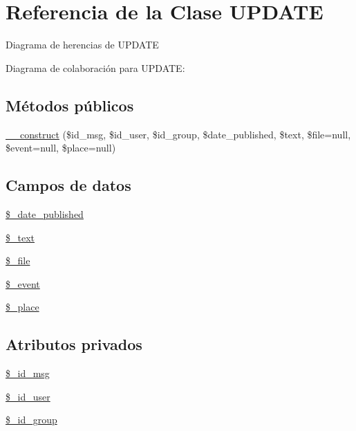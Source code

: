 \hypertarget{classUPDATE}{\section{Referencia de la Clase U\-P\-D\-A\-T\-E}
\label{classUPDATE}
}


Diagrama de herencias de U\-P\-D\-A\-T\-E


Diagrama de colaboración para U\-P\-D\-A\-T\-E\-:
\subsection*{Métodos públicos}
\begin{DoxyCompactItemize}
\item 
\hyperlink{classUPDATE_a409a623df5e13fa3a0354a114a2b159d}{\-\_\-\-\_\-construct} (\$id\-\_\-msg, \$id\-\_\-user, \$id\-\_\-group, \$date\-\_\-published, \$text, \$file=null, \$event=null, \$place=null)
\end{DoxyCompactItemize}
\subsection*{Campos de datos}
\begin{DoxyCompactItemize}
\item 
\hyperlink{classUPDATE_a18eb2ed8e237cc8ea4ab9beff2ac576a}{\$\-\_\-date\-\_\-published}
\item 
\hyperlink{classUPDATE_a30dbc932171e87783bf0630dcdb5ad36}{\$\-\_\-text}
\item 
\hyperlink{classUPDATE_abddaf0b77086e2b7d920f5d1a9616889}{\$\-\_\-file}
\item 
\hyperlink{classUPDATE_ad6c677c9355a932f4eb84a01ddf072c4}{\$\-\_\-event}
\item 
\hyperlink{classUPDATE_a7c2710f8add9b3b64b8f85f8d06d3687}{\$\-\_\-place}
\end{DoxyCompactItemize}
\subsection*{Atributos privados}
\begin{DoxyCompactItemize}
\item 
\hyperlink{classUPDATE_a63808e734406ff8eae9fc3dac25fca22}{\$\-\_\-id\-\_\-msg}
\item 
\hyperlink{classUPDATE_a09e313c6ebd36278e3777f8461c124a5}{\$\-\_\-id\-\_\-user}
\item 
\hyperlink{classUPDATE_aa323e6443296a4fc52d5783e8f1416e1}{\$\-\_\-id\-\_\-group}
\end{DoxyCompactItemize}


